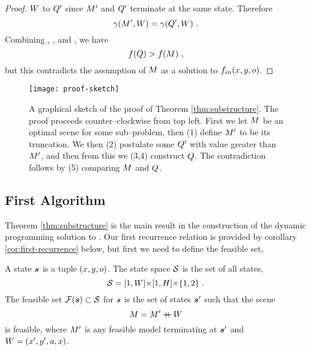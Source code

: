 \begin{proof}
  $\Wall$ to $\CfTruncScene$ since $\TruncScene$ and $\CfTruncScene$
  terminate at the same state. Therefore
  \begin{equation}
    \label{eq:equal-penalties}
    \CornerPenalty(\TruncScene,\Wall) =
    \CornerPenalty(\CfTruncScene,\Wall) ~.
  \end{equation}
  Combining , , and
  , we have
  \begin{equation}
    \Objective(\CfScene) > \Objective(\Scene) ~,
  \end{equation}
  but this contradicts the assumption of $\Scene$ as a solution to
  $\SubProbIN(x,y,\WallOrient)$.
\end{proof}

\begin{figure}[tb]
  \centering
  \texttt{[image: proof-sketch]}
  \caption{A graphical sketch of the proof of Theorem
    \ref{thm:substructure}. The proof proceeds counter--clockwise from top
    left. First we let $\Scene$ be an optimal scene for some
    sub--problem, then (1) define $\TruncScene$ to be its
    truncation. We then (2) postulate some $\CfTruncScene$ with value
    greater than $\TruncScene$, and then from this we (3,4) construct
    $\CfScene$. The contradiction follows by (5) comparing $\Scene$
    and $\CfScene$.}
  \label{fig:proof-sketch}
\end{figure}

\subsection{First Algorithm}
Theorem \ref{thm:substructure} is the main result in the construction
of the dynamic programming solution to . Our first
recurrence relation is provided by corollary
\ref{cor:first-recurrence} below, but first we need to define the
feasible set,
\begin{definition}
  A state $\State$ is a tuple $(x,y,\WallOrient)$. The state space
  $\StateSpace$ is the set of all states,
  \begin{equation}
    \StateSpace = [1,\Width] \cross [1,\Height] \cross \{1,2\} ~.
  \end{equation}
  The feasible set $\FeasibleSet(\State) \subset \StateSpace$ for
  $\State$ is the set of states $\State'$ such that the scene
  \begin{equation}
    \Scene = \Scene' \concat \Wall
  \end{equation}
  is feasible, where $\Scene'$ is any feasible model terminating at
  $\State'$ and $\Wall=(x',y',a,x)$.
\end{definition}

